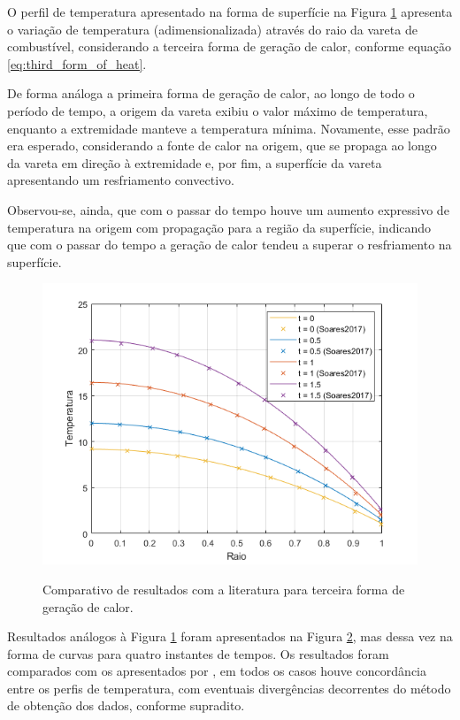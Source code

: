 \begin{figure}[H]
    \label{fig:surface03}
\end{figure}

O perfil de temperatura apresentado na forma de superfície na Figura \ref{fig:surface03} apresenta o variação de temperatura (adimensionalizada) através do raio da vareta de combustível, considerando a terceira forma de geração de calor, conforme equação \ref{eq:third_form_of_heat}.

De forma análoga a primeira forma de geração de calor, ao longo de todo o período de tempo, a origem da vareta exibiu o valor máximo de temperatura, enquanto a extremidade manteve a temperatura mínima. Novamente, esse padrão era esperado, considerando a fonte de calor na origem, que se propaga ao longo da vareta em direção à extremidade e, por fim, a superfície da vareta apresentando um resfriamento convectivo.

Observou-se, ainda, que com o passar do tempo houve um aumento expressivo de temperatura na origem com propagação para a região da superfície, indicando que com o passar do tempo a geração de calor tendeu a superar o resfriamento na superfície.

\begin{figure}[H]
    \centering
    \caption{Comparativo de resultados com a literatura para terceira forma de geração de calor.}
    \includegraphics[scale=0.7]{figures/results/Fig09.png}
    \label{fig:profile03}
\end{figure}

Resultados análogos à Figura \ref{fig:surface03} foram apresentados na Figura \ref{fig:profile03}, mas dessa vez na forma de curvas para quatro instantes de tempos. Os resultados foram comparados com os apresentados por \citet{soares2017}, em todos os casos houve concordância entre os perfis de temperatura, com eventuais divergências decorrentes do método de obtenção dos dados, conforme supradito.


